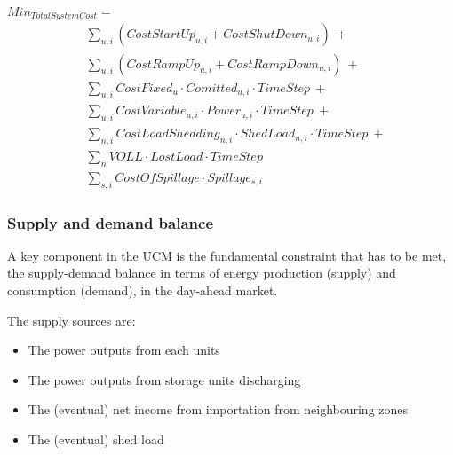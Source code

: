 \begin{captionnable}[h]
    $Min_{TotalSystemCost}=$
    \begin{equation}
        \begin{split}
            & \sum_{u,i} (CostStartUp_{u,i} + CostShutDown_{u,i}) \:+ \\
            & \sum_{u,i} (CostRampUp_{u,i} + CostRampDown_{u,i}) \:+ \\
            & \sum_{u,i} CostFixed_{u}\cdot Comitted_{u,i} \cdot TimeStep\:+ \\
            & \sum_{u,i} CostVariable_{u,i} \cdot Power_{u,i} \cdot TimeStep\:+ \\
            & \sum_{n,i} CostLoadShedding_{n,i}\cdot ShedLoad_{n,i} \cdot TimeStep \:+ \\
            & \sum_{n} VOLL \cdot LostLoad \cdot TimeStep \\
            & \sum_{s,i}CostOfSpillage \cdot Spillage_{s,i}
        \end{split}
        \label{obj-function-sum}
    \end{equation}
\end{captionnable}

\subsubsection{Supply and demand balance}

A key component in the UCM is the fundamental constraint that has to be met, the supply-demand balance in terms of energy production (supply) and consumption (demand), in the day-ahead market.

The supply sources are:
\begin{itemize}
    \item The power outputs from each units 
    \item The power outputs from storage units discharging
    \item The (eventual) net income from importation from neighbouring zones
    \item The (eventual) shed load
\end{itemize}

